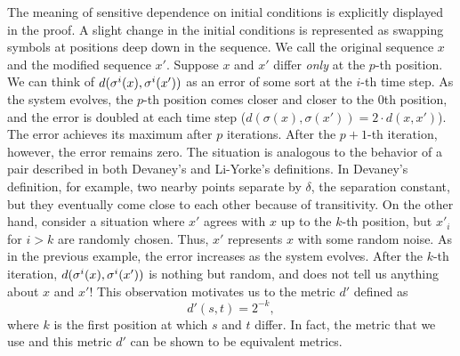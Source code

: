 \documentclass[10pt,twoside]{book}
\begin{document}
The meaning of sensitive dependence on initial conditions is explicitly displayed in the proof.
A slight change in the initial conditions is represented as swapping symbols at positions deep down in the sequence.
We call the original sequence $x$ and the modified sequence $x'$.
Suppose $x$ and $x'$ differ \textit{only} at the $p$-th position.
We can think of $d(\sigma^{i}(x), \sigma^{i}(x'))$ as an error of some sort at the $i$-th time step.
As the system evolves, the $p$-th position comes closer and closer to the 0th position, and the error is doubled at each time step ($d(\sigma(x), \sigma(x')) = 2 \cdot d(x, x')$).
The error achieves its maximum after $p$ iterations.
After the $p+1$-th iteration, however, the error remains zero.
The situation is analogous to the behavior of a pair described in both Devaney's and Li-Yorke's definitions.
In Devaney's definition, for example, two nearby points separate by $\delta$, the separation constant, but they eventually come close to each other because of transitivity.
On the other hand, consider a situation where $x'$ agrees with $x$ up to the $k$-th position, but $x'_i$ for $i > k$ are randomly chosen.
Thus, $x'$ represents $x$ with some random noise.
As in the previous example, the error increases as the system evolves.
After the $k$-th iteration, $d(\sigma^{i}(x), \sigma^{i}(x'))$ is nothing but random, and does not tell us anything about $x$ and $x'$!
This observation motivates us to the metric $d'$ defined as
\begin{equation*}
  d'(s,t) = 2^{-k},
\end{equation*}
where $k$ is the first position at which $s$ and $t$ differ.
In fact, the metric that we use and this metric $d'$ can be shown to be equivalent metrics.
\end{document}
